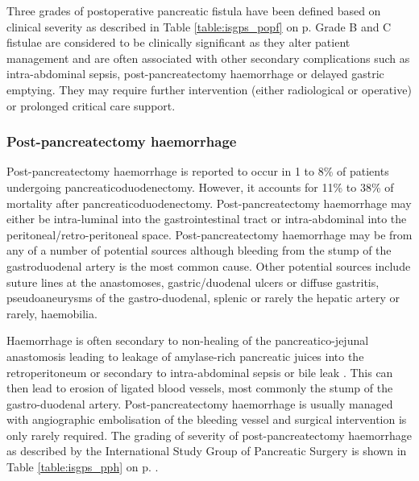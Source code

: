 Three grades of postoperative pancreatic fistula have been defined based on clinical severity as described in Table \ref{table:isgps_popf} on p\pageref{table:isgps_popf}. 
Grade B and C fistulae are considered to be clinically significant as they alter patient management and are often associated with other secondary complications such as intra-abdominal sepsis, post-pancreatectomy haemorrhage or delayed gastric emptying. 
They may require further intervention (either radiological or operative) or prolonged critical care support. 

\subsubsection{Post-pancreatectomy haemorrhage}
\label{sec:ch_intro_PPH}
Post-pancreatectomy haemorrhage is reported to occur in 1 to 8\% of patients undergoing pancreaticoduodenectomy. 
However, it accounts for 11\% to 38\% of mortality after pancreaticoduodenectomy. 
Post-pancreatectomy haemorrhage may either be intra-luminal into the gastrointestinal tract or intra-abdominal into the peritoneal/retro-peritoneal space. 
Post-pancreatectomy haemorrhage may be from any of a number of potential sources although bleeding from the stump of the gastroduodenal artery is the most common cause. 
Other potential sources include suture lines at the anastomoses, gastric/duodenal ulcers or diffuse gastritis, pseudoaneurysms of the gastro-duodenal, splenic or rarely the hepatic artery or rarely, haemobilia.

Haemorrhage is often secondary to non-healing of the pancreatico-jejunal anastomosis leading to leakage of amylase-rich pancreatic juices into the retroperitoneum or secondary to intra-abdominal sepsis or bile leak \parencite{tien_risk_2005, koukoutsis_haemorrhage_2006, choi_delayed_2004, balladur_bleeding_1996}. 
This can then lead to erosion of ligated blood vessels, most commonly the stump of the gastro-duodenal artery. 
Post-pancreatectomy haemorrhage is usually managed with angiographic embolisation of the bleeding vessel and surgical intervention is only rarely required. 
The grading of severity of post-pancreatectomy haemorrhage as described by the International Study Group of Pancreatic Surgery \parencite{wente_postpancreatectomy_2007} is shown in Table \ref{table:isgps_pph} on p\pageref{table:isgps_pph}. .

